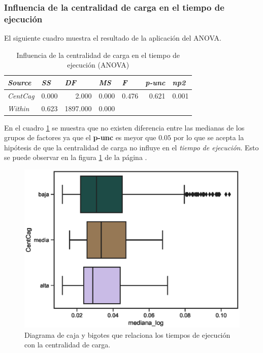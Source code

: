 \documentclass{article}
\begin{document}
\newpage
\subsubsection{Influencia de la centralidad de carga en el tiempo de ejecución}

El siguiente cuadro muestra el resultado de la aplicación del ANOVA.

\begin{table}[htbp]
  \centering
  \caption{Influencia de la centralidad de carga en el tiempo de ejecución (ANOVA)}
    \begin{tabular}{lrrrrrr}
    \toprule
    \textit{\textbf{Source}} & \multicolumn{1}{l}{\textit{\textbf{SS}}} & \multicolumn{1}{l}{\textit{\textbf{DF}}} & \multicolumn{1}{l}{\textit{\textbf{MS}}} & \multicolumn{1}{l}{\textit{\textbf{F}}} & \multicolumn{1}{l}{\textit{\textbf{p-unc}}} & \multicolumn{1}{l}{\textit{\textbf{np2}}} \\
    \midrule
    \textit{CentCag} & 0.000 & 2.000 & 0.000 & 0.476 & 0.621 & 0.001 \\
    \textit{Within} & 0.623 & 1897.000 & 0.000 &       &       &  \\
    \bottomrule
    \end{tabular}%
  \label{tab:t9}%
\end{table}%

En el cuadro \ref{tab:t9} se muestra que no existen diferencia entre las medianas de los grupos de factores ya que el {\bf p-unc } es meyor que $0.05$ por lo que se acepta la hipótesis de que la centralidad de carga no influye en el \textit{tiempo de ejecución}. Esto se puede observar en la figura \ref{fig16} de la página \pageref{fig16}.

\begin{center}
\begin{figure}[htbp]
\includegraphics[scale=0.6]{boxplot_CentCag.eps}
\caption{Diagrama de caja y bigotes que relaciona los tiempos de ejecución con la centralidad de carga.}
\label{fig16}
\end{figure}
\end{center}
\newpage
\end{document}
